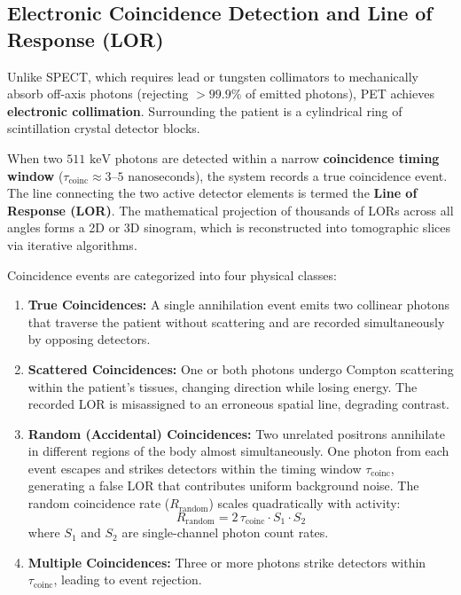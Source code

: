 \documentclass[11pt,a4paper]{article}
\begin{document}
\subsection{Electronic Coincidence Detection and Line of Response (LOR)}
Unlike SPECT, which requires lead or tungsten collimators to mechanically absorb off-axis photons (rejecting $> 99.9\%$ of emitted photons), PET achieves \textbf{electronic collimation}. Surrounding the patient is a cylindrical ring of scintillation crystal detector blocks. 

When two $511\text{ keV}$ photons are detected within a narrow \textbf{coincidence timing window} ($\tau_{\text{coinc}} \approx 3\text{--}5\text{ nanoseconds}$), the system records a true coincidence event. The line connecting the two active detector elements is termed the \textbf{Line of Response (LOR)}. The mathematical projection of thousands of LORs across all angles forms a 2D or 3D sinogram, which is reconstructed into tomographic slices via iterative algorithms.

Coincidence events are categorized into four physical classes:
\begin{enumerate}
    \item \textbf{True Coincidences:} A single annihilation event emits two collinear photons that traverse the patient without scattering and are recorded simultaneously by opposing detectors.
    \item \textbf{Scattered Coincidences:} One or both photons undergo Compton scattering within the patient's tissues, changing direction while losing energy. The recorded LOR is misassigned to an erroneous spatial line, degrading contrast.
    \item \textbf{Random (Accidental) Coincidences:} Two unrelated positrons annihilate in different regions of the body almost simultaneously. One photon from each event escapes and strikes detectors within the timing window $\tau_{\text{coinc}}$, generating a false LOR that contributes uniform background noise. The random coincidence rate ($R_{\text{random}}$) scales quadratically with activity:
    \begin{equation}
        R_{\text{random}} = 2 \, \tau_{\text{coinc}} \cdot S_1 \cdot S_2
    \end{equation}
    where $S_1$ and $S_2$ are single-channel photon count rates.
    \item \textbf{Multiple Coincidences:} Three or more photons strike detectors within $\tau_{\text{coinc}}$, leading to event rejection.
\end{enumerate}
\end{document}
